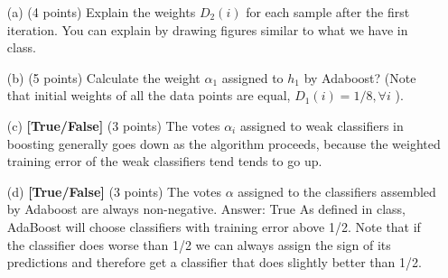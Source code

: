\documentclass[a4paper,12pt,fleqn]{article}
\begin{document}
\begin{enumerate}
\item[(a)] (4 points) Explain the weights $D_2(i)$ for each sample after the first iteration. You can explain by drawing figures similar to what we have in class. 

\vspace{3cm}

\item[(b)] (5 points) Calculate the weight $\alpha_1$ assigned to $h_1$ by Adaboost? (Note that initial weights of all the data points are equal, $D_1(i) = 1/8, \forall i$ ). 
\vspace{3cm}



\item[(c)] \textbf{[True/False]} (3 points) The votes $\alpha_i$ assigned to weak classifiers in boosting generally goes down as the algorithm proceeds, because the weighted training error of the weak classifiers tend tends to go up.


\item[(d)] \textbf{[True/False]} (3 points) The votes $\alpha$ assigned to the classifiers assembled by Adaboost are always non-negative. 
 Answer: True As defined in class, AdaBoost will choose classifiers with training error above 1/2. %
 Note that if the classifier does worse than 1/2 we can always assign the sign of its predictions and therefore get a classifier that does slightly better than 1/2. 

\end{enumerate}
\end{document}
